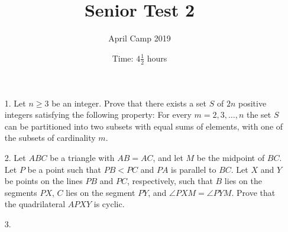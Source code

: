 \documentclass[a4paper, 12pt]{article}
\title{Senior Test 2}
\author{April Camp 2019}
\date{Time: $4 \frac{1}{2}$ hours}
\begin{document}
 \maketitle

\begin{enumerate}

\item[1.]  Let $n \geq 3$ be an integer. Prove that there exists a set $S$ of $2n$ positive integers satisfying the following property: For every $m = 2, 3, \dots, n$ the set $S$ can be partitioned into two subsets with equal sums of elements, with one of the subsets of cardinality $m$. \\
\vspace{20pt}

\item[2.]  Let $ABC$ be a triangle with $AB=AC$, and let $M$ be the midpoint of $BC$. Let $P$ be a point such that $PB < PC$ and $PA$ is parallel to $BC$. Let $X$ and $Y$ be points on the lines $PB$ and $PC$, respectively, such that $B$ lies on the segments $PX$, $C$ lies on the segment $PY$, and $\angle PXM = \angle PYM$. Prove that the quadrilateral $APXY$ is cyclic.

\vspace{20pt}

\item[3.]   
%


\end{enumerate}

\vfill

\centering

\vspace{12mm}
\end{document}
